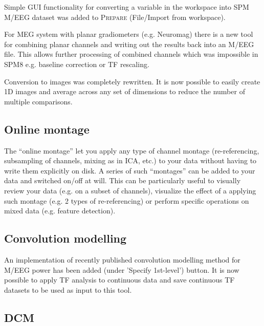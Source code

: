 \documentclass[a4paper,titlepage,openany]{article}
\begin{document}
\begin{multicols}{2}
Simple GUI functionality for converting a variable in the workspace into SPM M/EEG dataset was added to \textsc{Prepare} (File/Import from workspace).

For MEG system with planar gradiometers (e.g. Neuromag) there is a new tool for combining planar channels and writing out the results back into an M/EEG file. This allows further processing of combined channels which was impossible in SPM8 e.g. baseline correction or TF rescaling.

Conversion to images was completely rewritten. It is now possible to easily create 1D images and average across any set of dimensions to reduce the number of multiple comparisons.

\subsection{Online montage}

The ``online montage'' let you apply any type of channel montage (re-referencing, subsampling of channels, mixing as in ICA, etc.) to your data without having to write them explicitly on disk. A series of such ``montages'' can be added to your data and switched on/off at will. This can be particularly useful to visually review your data (e.g. on a subset of channels), visualize the effect of a applying such montage (e.g. 2 types of re-referencing) or perform specific operations on mixed data (e.g. feature detection).

\subsection{Convolution modelling}

An implementation of recently published convolution modelling method for M/EEG power \cite{Litvak_ConvModel_2013} has been added (under 'Specify 1st-level') button. It is now possible to apply TF analysis to continuous data and save continuous TF datasets to be used as input to this tool.

\subsection{DCM}


\end{multicols}
\end{document}
